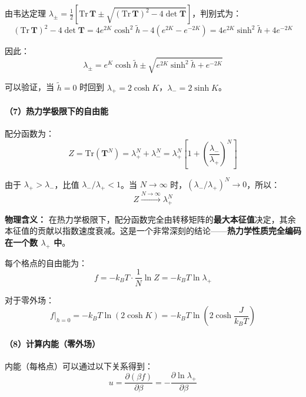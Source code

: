 \documentclass[12pt,a4paper]{ctexart}
\begin{document}
由韦达定理 $\lambda_\pm = \frac{1}{2}\!\left[\mathrm{Tr}\,\mathbf{T} \pm \sqrt{(\mathrm{Tr}\,\mathbf{T})^2 - 4\det\mathbf{T}}\right]$，判别式为：
\[
(\mathrm{Tr}\,\mathbf{T})^2 - 4\det\mathbf{T} = 4e^{2K}\cosh^2\!\tilde{h} - 4(e^{2K} - e^{-2K}) = 4e^{2K}\sinh^2\!\tilde{h} + 4e^{-2K}
\]

因此：
\begin{equation}
\boxed{
\lambda_\pm = e^K \cosh\tilde{h} \pm \sqrt{e^{2K}\sinh^2\!\tilde{h} + e^{-2K}}
}
\end{equation}

可以验证，当 $\tilde{h} = 0$ 时回到 $\lambda_+ = 2\cosh K$，$\lambda_- = 2\sinh K$。

\paragraph{（7）热力学极限下的自由能}

配分函数为：
\[
Z = \mathrm{Tr}(\mathbf{T}^N) = \lambda_+^N + \lambda_-^N = \lambda_+^N \!\left[1 + \left(\frac{\lambda_-}{\lambda_+}\right)^{\!N}\right]
\]

由于 $\lambda_+ > \lambda_-$，比值 $\lambda_-/\lambda_+ < 1$。当 $N \to \infty$ 时，$(\lambda_-/\lambda_+)^N \to 0$，所以：
\begin{equation}
Z \xrightarrow{N \to \infty} \lambda_+^N
\end{equation}

\textbf{物理含义：} 在热力学极限下，配分函数完全由转移矩阵的\textbf{最大本征值}决定，其余本征值的贡献以指数速度衰减。这是一个非常深刻的结论——\textbf{热力学性质完全编码在一个数 $\lambda_+$ 中}。

每个格点的自由能为：
\begin{equation}
\boxed{
f = -k_B T \cdot \frac{1}{N}\ln Z = -k_B T \ln \lambda_+
}
\end{equation}

对于零外场：
\begin{equation}
f\big|_{h=0} = -k_B T \ln(2\cosh K) = -k_B T \ln\!\left(2\cosh\frac{J}{k_B T}\right)
\end{equation}

\paragraph{（8）计算内能（零外场）}

内能（每格点）可以通过以下关系得到：
\[
u = \frac{\partial (\beta f)}{\partial \beta} = -\frac{\partial \ln \lambda_+}{\partial \beta}
\]
\end{document}
